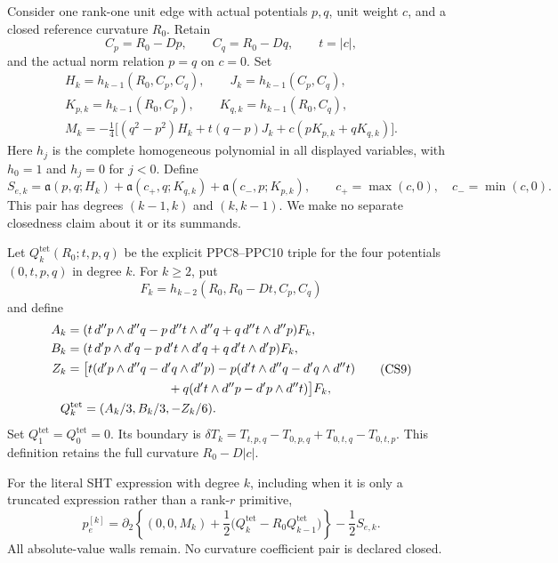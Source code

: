 Consider one rank-one unit edge with actual potentials $p,q$, unit
weight $c$, and a closed reference curvature $R_0$.  Retain
\[
 C_p=R_0-Dp,\qquad C_q=R_0-Dq,\qquad t=|c|,
 \tag{CS5}
\]
and the actual norm relation $p=q$ on $c=0$.  Set
\[
 \begin{gathered}
 H_k=h_{k-1}(R_0,C_p,C_q),\qquad J_k=h_{k-1}(C_p,C_q),\\
 K_{p,k}=h_{k-1}(R_0,C_p),\qquad K_{q,k}=h_{k-1}(R_0,C_q),\\
 M_k=-\frac14\bigl[(q^2-p^2)H_k+t(q-p)J_k
                                      +c(pK_{p,k}+qK_{q,k})\bigr].
 \end{gathered}
 \tag{CS6}
\]
Here $h_j$ is the complete homogeneous polynomial in all displayed
variables, with $h_0=1$ and $h_j=0$ for $j<0$.  Define
\[
 S_{e,k}=\mathfrak a(p,q;H_k)
             +\mathfrak a(c_+,q;K_{q,k})
             +\mathfrak a(c_-,p;K_{p,k}),\qquad
 c_+=\max(c,0),\quad c_-=\min(c,0).
 \tag{CS7}
\]
This pair has degrees $(k-1,k)$ and $(k,k-1)$.  We make no
separate closedness claim about it or its summands.

Let $Q_k^{\mathrm{tet}}(R_0;t,p,q)$ be the explicit PPC8--PPC10
triple for the four potentials $(0,t,p,q)$ in degree $k$.
For $k\ge2$, put
\[
 F_k=h_{k-2}(R_0,R_0-Dt,C_p,C_q)
 \tag{CS8}
\]
and define
\[
 \begin{split}
 A_k={}&(t\,d''p\wedge d''q-p\,d''t\wedge d''q
                                      +q\,d''t\wedge d''p)F_k,\\
 B_k={}&(t\,d'p\wedge d'q-p\,d't\wedge d'q
                                      +q\,d't\wedge d'p)F_k,\\
 Z_k={}&\bigl[t(d'p\wedge d''q-d'q\wedge d''p)
           -p(d't\wedge d''q-d'q\wedge d''t)\\
 &\hspace{24mm}+q(d't\wedge d''p-d'p\wedge d''t)\bigr]F_k,\\
 Q_k^{\mathrm{tet}}&=(A_k/3,B_k/3,-Z_k/6).
 \end{split}
 \tag{CS9}
\]
Set $Q_1^{\mathrm{tet}}=Q_0^{\mathrm{tet}}=0$.  Its boundary is
$\delta T_k=T_{t,p,q}-T_{0,p,q}+T_{0,t,q}-T_{0,t,p}$.
This definition retains the full curvature $R_0-D|c|$.

\begin{lemma}
For the literal SHT expression with degree $k$, including when it is
only a truncated expression rather than a rank-$r$ primitive,
\[
 \boxed{\quad
 p_e^{[k]}=
 \partial_2\left\{(0,0,M_k)+\frac12
       \bigl(Q_k^{\mathrm{tet}}-R_0Q_{k-1}^{\mathrm{tet}}\bigr)\right\}
                                      -\frac12S_{e,k}.
 \quad}
 \tag{CS10}
\]
All absolute-value walls remain.  No curvature coefficient pair is
declared closed.
\end{lemma}

